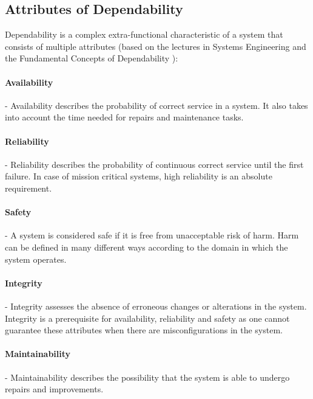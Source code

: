 \subsection{Attributes of Dependability} \label{dependability-attributes}

Dependability is a complex extra-functional characteristic of a system that consists of multiple attributes (based on the lectures in Systems Engineering \cite{DependabilityBMEMIT} and the Fundamental Concepts of Dependability \cite{FundamentalConceptsOfDependability}):

\paragraph{Availability} - Availability describes the probability of correct service in a system. It also takes into account the time needed for repairs and maintenance tasks.

\paragraph{Reliability} - Reliability describes the probability of continuous correct service until the first failure. In case of mission critical systems, high reliability is an absolute requirement.

\paragraph{Safety} - A system is considered safe if it is free from unacceptable risk of harm. Harm can be defined in many different ways according to the domain in which the system operates.

\paragraph{Integrity} - Integrity assesses the absence of erroneous changes or alterations in the system. Integrity is a prerequisite for availability, reliability and safety as one cannot guarantee these attributes when there are misconfigurations in the system.

\paragraph{Maintainability} - Maintainability describes the possibility that the system is able to undergo repairs and improvements.


